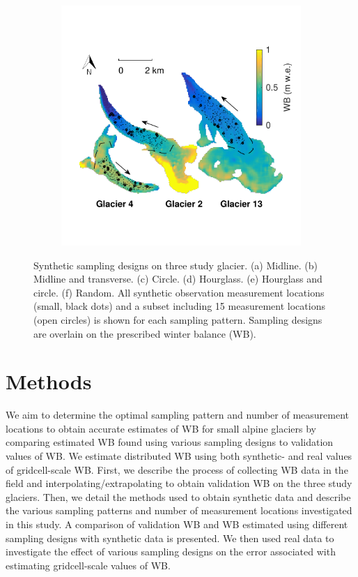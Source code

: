 \documentclass[twocolumn,letterpaper]{igs}
\begin{document}
\begin{figure}
\begin{subfigure}[b]{0.475\textwidth}
             \caption[]{}    
        \end{subfigure}
        \quad
        \begin{subfigure}[b]{0.475\textwidth}   
            \centering 
            \includegraphics[width=\textwidth]{SampleDesign_RandomSafe.pdf}
            \caption[]{}    
        \end{subfigure}
        \caption{Synthetic sampling designs on three study glacier. (a) Midline. (b) Midline and transverse. (c) Circle. (d) Hourglass. (e) Hourglass and circle. (f) Random. All synthetic observation measurement locations (small, black dots) and a subset including 15 measurement locations (open circles) is shown for each sampling pattern. Sampling designs are overlain on the prescribed winter balance (WB). } 
        \label{fig:SyntheticSampleDesign}
    \end{figure}


\section{Methods}

We aim to determine the optimal sampling pattern and number of measurement locations to obtain accurate estimates of WB for small alpine glaciers by comparing estimated WB found using various sampling designs to validation values of WB. We estimate distributed WB using both synthetic- and real values of gridcell-scale WB. First, we describe the process of collecting WB data in the field and interpolating/extrapolating to obtain validation WB on the three study glaciers. Then, we detail the methods used to obtain synthetic data and describe the various sampling patterns and number of measurement locations investigated in this study. A comparison of validation WB and WB estimated using different sampling designs with synthetic data is presented. We then used real data to investigate the effect of various sampling designs on the error associated with estimating gridcell-scale values of WB.
\end{document}
